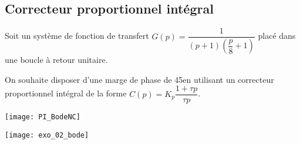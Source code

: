 %
%

\subsection*{Correcteur proportionnel intégral}

\ifprof
\else
Soit un système de fonction de transfert $G(p)=\dfrac{1}{\left(p+1\right)\left(\dfrac{p}{8}+1\right)}$ placé dans une boucle à retour unitaire.

On souhaite disposer d'une marge de phase de 45\degres en utilisant un correcteur proportionnel intégral de la forme $C(p)=K_p\dfrac{1+\tau p}{\tau p}$.
\fi

\ifprof
\begin{corrige}
\begin{center}
\texttt{[image: PI\_BodeNC]}
\end{center}
\end{corrige}
\else
\begin{center}
\texttt{[image: exo\_02\_bode]}
\end{center}
\fi


